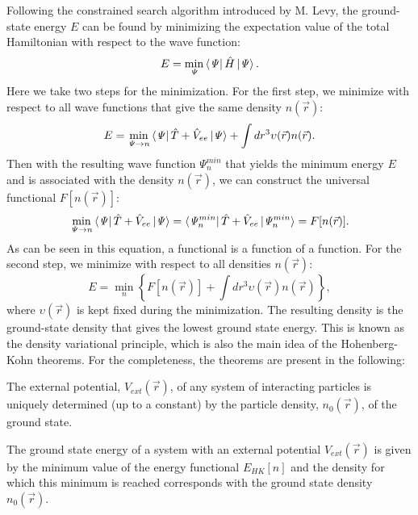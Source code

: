 Following the constrained search algorithm introduced by M. Levy\cite{Levy1979}, the ground-state energy $E$ can be found by minimizing the expectation value of the total Hamiltonian with respect to the wave function:
\begin{equation}
E=\min_\mathit{\Psi}\bra{\mathit{\Psi}}\hat{H}\ket{\mathit{\Psi}}.
\end{equation}
Here we take two steps for the minimization. For the first step, we minimize with respect to all wave functions that give the same density $n(\vec{r})$:
\begin{equation}
E=\min_{\mathit{\Psi}\rightarrow n}\bra{\mathit{\Psi}}\hat{T}+\hat{V}_{ee}\ket{\mathit{\Psi}}+\int dr^3\upsilon(\vec{r})n(\vec{r}).
\end{equation}
Then with the resulting wave function $\mathit{\Psi}^{min}_n$ that yields the minimum energy $E$ and is associated with the density $n(\vec{r})$, we can construct the universal functional $F[n(\vec{r})]$:
\begin{equation}
\min_{\mathit{\Psi}\rightarrow n}\bra{\mathit{\Psi}}\hat{T}+\hat{V}_{ee}\ket{\mathit{\Psi}}=\bra{\mathit{\Psi}^{min}_n}\hat{T}+\hat{V}_{ee}\ket{\mathit{\Psi}^{min}_n}=F[n(\vec{r})].
\end{equation}
As can be seen in this equation, a functional is a function of a function. For the second step, we minimize with respect to all densities $n(\vec{r})$:
\begin{equation}
E=\min_n \left\lbrace F[n(\vec{r})] + \int dr^3\upsilon(\vec{r})n(\vec{r}) \right\rbrace,
\end{equation}
where $\upsilon(\vec{r})$ is kept fixed during the minimization. The resulting density is the ground-state density that gives the lowest ground state energy. This is known as the density variational principle, which is also the main idea of the Hohenberg-Kohn theorems. For the completeness, the theorems are present in the following:
\begin{theorem}
The external potential, $V_{ext}(\vec{r})$, of any system of interacting particles is uniquely determined (up to a constant) by the particle density, $n_0(\vec{r})$, of the ground state.
\end{theorem}
\begin{theorem}
The ground state energy of a system with an external potential $V_{ext}(\vec{r})$ is given by the minimum value of the energy functional $E_{HK} [n]$ and the density for which this minimum is reached corresponds with the ground state density $n_0(\vec{r})$.
\end{theorem}

